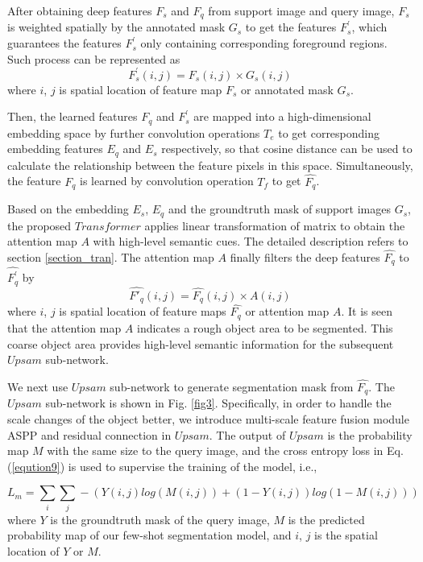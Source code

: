 \documentclass[runningheads]{llncs}
\begin{document}
After obtaining deep features $F_s$ and $F_q$ from support image and query image, $F_s$ is weighted spatially by the annotated mask $G_{s}$ to get the features $F^{'}_s$, which guarantees the features $F^{'}_s$ only containing corresponding foreground regions. Such process can be represented as
\begin{equation}
F^{'}_{s}{(i, j)} = F_{s}(i, j) \times G_{s}(i, j) \label{eqution1}
\end{equation}
where $i$, $j$ is spatial location of feature map $F_s$ or annotated mask  $G_s$.

Then, the learned features $F_q$ and $F^{'}_s$ are mapped into a high-dimensional embedding space by further convolution operations $T_e$ to get corresponding embedding features $E_q$ and $E_s$ respectively, so that cosine distance can be used to calculate the relationship between the feature pixels in this space. Simultaneously, the feature $F_q$ is learned by convolution operation $T_f$ to get $\hat{F_q}$. 

Based on the embedding $E_s$, $E_q$ and the groundtruth mask of support images $G_s$, the proposed $Transformer$ applies linear transformation of matrix to obtain the attention map $A$ with high-level semantic cues. The detailed description refers to section \ref{section_tran}.
The attention map $A$ finally filters the deep features $\hat{F_q}$ to $\hat{F_q^{'}}$ by 
\begin{equation}
\hat{F'_q}(i, j) = \hat{F_q}(i, j) \times A(i, j) \label{eqution2}
\end{equation}
where $i$, $j$ is spatial location of feature maps $\hat{F_q}$ or attention map $A$. It is seen that the attention map $A$ indicates a rough object area to be segmented. This coarse object area provides high-level semantic information for the subsequent $Upsam$ sub-network.

We next use $Upsam$ sub-network to generate segmentation mask from $\hat{F_q}$. The $Upsam$ sub-network is shown in Fig. \ref{fig3}. Specifically, in order to handle the scale changes of the object better, we introduce multi-scale feature fusion module ASPP\cite{ref_crfv1} and residual connection \cite{ref_resnet} in $Upsam$. The output of $Upsam$ is the probability map $M$ with the same size to the query image, and the cross entropy loss in Eq. (\ref{eqution9}) is used to supervise the training of the model, i.e.,

\begin{equation}
L_m = \sum_{i}\sum_{j}-(Y(i, j)log(M(i, j)) + (1-Y(i, j))log(1-M(i, j)))
 \label{eqution9}
\end{equation}
where $Y$ is the groundtruth mask of the query image, $M$ is the predicted probability map of our few-shot segmentation model, and $i$, $j$ is the spatial location of $Y$ or $M$.
\end{document}
